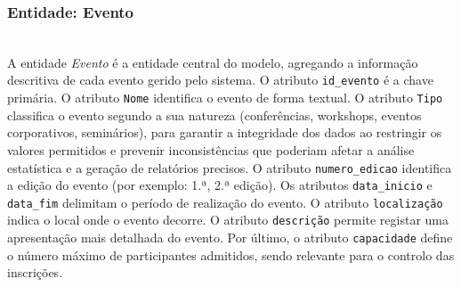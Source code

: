 \documentclass[runningheads]{llncs}
\begin{document}
                    \noindent\begin{minipage}{\textwidth}
                    \subsubsection{Entidade: Evento}\mbox{}\\

                    A entidade \textit{Evento} é a entidade central do modelo, agregando a informação descritiva 
                    de cada evento gerido pelo sistema. O atributo \texttt{id\_evento} é a chave primária. 
                    O atributo \texttt{Nome} identifica o evento de forma textual. O atributo \texttt{Tipo} 
                    classifica o evento segundo a sua natureza (conferências, workshops, eventos corporativos, seminários), para garantir a integridade dos dados ao restringir os valores permitidos e prevenir inconsistências que poderiam afetar a análise estatística e a geração de relatórios precisos.
                    O atributo \texttt{numero\_edicao} identifica a edição do evento (por exemplo: 1.ª, 2.ª edição).
                    Os atributos \texttt{data\_inicio} e \texttt{data\_fim} delimitam o período de realização 
                    do evento. O atributo \texttt{localização} indica o local onde o evento decorre. O atributo 
                    \texttt{descrição} permite registar uma apresentação mais detalhada do evento. Por último, 
                    o atributo \texttt{capacidade} define o número máximo de participantes admitidos, sendo 
                    relevante para o controlo das inscrições.


\end{minipage}
\end{document}
